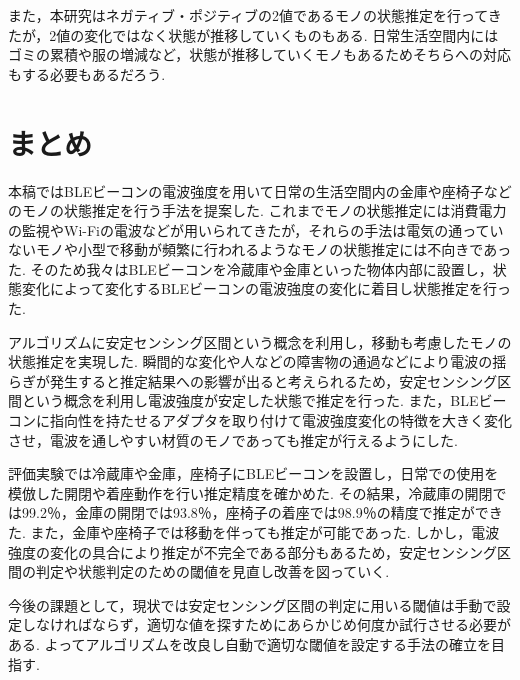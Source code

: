 \documentclass[Japanese]{dicomopapers}
\begin{document}
また，本研究はネガティブ・ポジティブの2値であるモノの状態推定を行ってきたが，2値の変化ではなく状態が推移していくものもある.
日常生活空間内にはゴミの累積や服の増減など，状態が推移していくモノもあるためそちらへの対応もする必要もあるだろう.




\section{まとめ}

本稿ではBLEビーコンの電波強度を用いて日常の生活空間内の金庫や座椅子などのモノの状態推定を行う手法を提案した.
これまでモノの状態推定には消費電力の監視やWi-Fiの電波などが用いられてきたが，それらの手法は電気の通っていないモノや小型で移動が頻繁に行われるようなモノの状態推定には不向きであった.
そのため我々はBLEビーコンを冷蔵庫や金庫といった物体内部に設置し，状態変化によって変化するBLEビーコンの電波強度の変化に着目し状態推定を行った.

アルゴリズムに安定センシング区間という概念を利用し，移動も考慮したモノの状態推定を実現した.
瞬間的な変化や人などの障害物の通過などにより電波の揺らぎが発生すると推定結果への影響が出ると考えられるため，安定センシング区間という概念を利用し電波強度が安定した状態で推定を行った.
また，BLEビーコンに指向性を持たせるアダプタを取り付けて電波強度変化の特徴を大きく変化させ，電波を通しやすい材質のモノであっても推定が行えるようにした.

評価実験では冷蔵庫や金庫，座椅子にBLEビーコンを設置し，日常での使用を模倣した開閉や着座動作を行い推定精度を確かめた.
その結果，冷蔵庫の開閉では99.2％，金庫の開閉では93.8％，座椅子の着座では98.9％の精度で推定ができた.
また，金庫や座椅子では移動を伴っても推定が可能であった.
しかし，電波強度の変化の具合により推定が不完全である部分もあるため，安定センシング区間の判定や状態判定のための閾値を見直し改善を図っていく.


今後の課題として，現状では安定センシング区間の判定に用いる閾値は手動で設定しなければならず，適切な値を探すためにあらかじめ何度か試行させる必要がある.
よってアルゴリズムを改良し自動で適切な閾値を設定する手法の確立を目指す.


\end{document}

